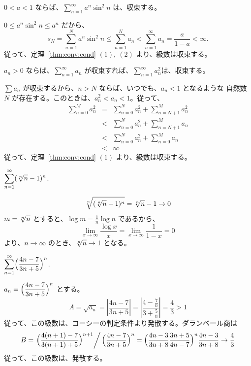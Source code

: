 \begin{eg}
$0<a<1$ ならば、${\displaystyle \sum_{n=1}^\infty a^n\sin^2 n}$ は、収束する。

\smallskip
$0\leq a^n\sin^2 n\leq a^n$ だから、
$$s_N = \sum_{n=1}^Na^n\sin^2 n\leq \sum_{n=1}^N a_n < \sum_{n=1}^\infty a_n = \frac{a}{1-a} < \infty.$$
従って、定理~\ref{thm:conv:cond} $(1),\:(2)$ より、級数は収束する。
\end{eg}

\begin{eg}
$a_n>0$ ならば、${\displaystyle \sum_{n=1}^\infty a_n}$ が収束すれば、${\displaystyle \sum_{n=1}^\infty a_n^2}$は、収束する。

\smallskip
$\sum a_n$ が収束するから、$n>N$ ならば、いつでも、$a_n<1$ となるような 自然数 $N$ が存在する。このときは、$a_n^2 < a_n < 1$。従って、
\begin{eqnarray*}
\sum_{n=0}^M a_n^2 & = & \sum_{n=0}^N a_n^2 + \sum_{n=N+1}^M a_n^2\\
& < & \sum_{n=0}^N a_n^2 + \sum_{n=N+1}^M a_n\\
& < & \sum_{n=0}^N a_n^2 + \sum_{n=0}^M a_n\\
& < & \infty
\end{eqnarray*}
従って、定理~\ref{thm:conv:cond} $(1)$ より、級数は収束する。
\end{eg}
 
\begin{eg}
${\displaystyle \sum_{n=1}^\infty (\root{n}\of{n}-1)^n}$.

\smallskip
$$\root{n}\of{(\root{n}\of{n}-1)^n} = \root{n}\of{n} -1 \to 0$$
$m = \root{n}\of{n}$ とすると、$\log m = \frac{1}{n}\log n$ であるから、
$$\lim_{x\to \infty}\frac{\log x}{x} = \lim_{x\to \infty}\frac{1}{1-x} = 0$$
より、$n\to \infty$ のとき、$\root{n}\of{n} \to 1$ となる。
\end{eg}

\begin{eg}
${\displaystyle \sum_{n=1}^\infty \Bigl(\frac{4n-7}{3n+5}\Bigr)^n}$.

\smallskip
${\displaystyle a_n = \Bigl(\frac{4n-7}{3n+5}\Bigr)^n}$ とする。
$$A = \sqrt{a_n} = \left|\frac{4n-7}{3n+5}\right| = \left|\frac{4-\frac7n}{3+\frac5n}\right| = \frac43 > 1$$
従って、この級数は、コーシーの判定条件より発散する。ダランベール商は
$$B = \left.\Bigl(\frac{4(n+1)-7}{3(n+1)+5}\Bigr)^{n+1}\right/\Bigl(\frac{4n-7}{3n+5}\Bigr)^n = \Bigl(\frac{4n-3}{3n+8}\frac{3n+5}{4n-7}\Bigr)^n\frac{4n-3}{3n+8}\to \frac43$$
従って、この級数は、発散する。
\end{eg}

